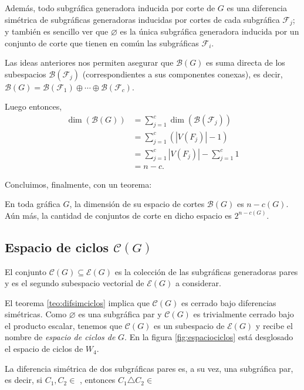 Además, todo subgráfica generadora inducida por corte de $G$ es una diferencia simétrica de subgráficas generadoras inducidas por cortes de cada subgráfica $\mathcal{F}_{j}$; y también es sencillo ver que $\varnothing$ es la única subgráfica generadora inducida por un conjunto de corte que tienen en común las subgráficas $\mathcal{F}_{i}$. 

Las ideas anteriores nos permiten asegurar que $\mathcal{B}(G)$ es suma directa de los subespacios $\mathcal{B}(\mathcal{F}_{j})$ (correspondientes a sus componentes conexas), es decir, $\mathcal{B}(G)= \mathcal{B}(\mathcal{F}_{1}) \oplus \cdots \oplus \mathcal{B}(\mathcal{F}_{c})$.

Luego entonces, 
\begin{align*}
    \dim(\mathcal{B}(G)) &= \sum_{j = 1}^{c}\dim(\mathcal{B}(\mathcal{F}_{j}))\\
    &= \sum_{j = 1}^{c} (|V(F_{j})| - 1) \\
    &= \sum_{j=1}^{c} |V(F_{j})| - \sum_{j=1}^{c} 1\\
    &= n - c.
\end{align*}

Concluimos, finalmente, con un teorema:

\begin{teo} \label{teo:dimcortes}
En toda gráfica $G$, la dimensión de su espacio de cortes $\mathcal{B}(G)$ es $n-c(G)$. Aún más, la cantidad de conjuntos de corte en dicho espacio es $2^{n-c(G)}$.
\end{teo}

\subsection{Espacio de ciclos $\mathcal{C}(G)$}

El conjunto $\mathcal{C}(G) \subseteq \mathcal{E}(G)$ es la colección de las subgráficas generadoras pares y es el segundo subespacio vectorial de $\mathcal{E}(G)$ a considerar.

El teorema \ref{teo:difsimciclos}  implica que $\mathcal{C}(G)$ es cerrado bajo diferencias simétricas. Como $\varnothing$ es una subgráfica par y $\mathcal{C}(G)$ es trivialmente cerrado bajo el producto escalar, tenemos que $\mathcal{C}(G)$ es un subespacio de $\mathcal{E}(G)$ y recibe el nombre de  \textit{espacio de ciclos de} $G$. En la figura \ref{fig:espaciociclos} está desglosado el espacio de ciclos de $W_{4}$.

\begin{teo} \label{teo:difsimciclos2}
La diferencia simétrica de dos subgráficas pares es, a su vez, una subgráfica par, es decir, si $C_{1},C_{2} \in$ \cyclet, entonces $C_{1} \triangle C_{2}\in$ \cyclet
\end{teo}

